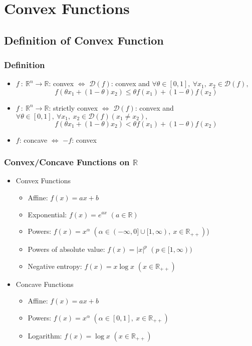 \section{Convex Functions}

\subsection{Definition of Convex Function}

\subsubsection*{Definition}
\begin{itemize}
    \item $f~:~\mathbb{R}^n \rightarrow \mathbb{R}$: convex $\Leftrightarrow$
    $\mathcal{D}(f)$: convex and $\forall \theta \in [0,1],~\forall x_1,~x_2 \in \mathcal{D}(f),$
    $$ f(\theta x_1 + (1 - \theta) x_2 ) \leq \theta f(x_1) + (1 - \theta)f(x_2) $$
    \item $f~:~\mathbb{R}^n \rightarrow \mathbb{R}$: strictly convex $\Leftrightarrow$
    $\mathcal{D}(f)$: convex and $\forall \theta \in [0,1],
    ~\forall x_1,~x_2 \in \mathcal{D}(f) (x_1 \neq x_2),$
    $$ f(\theta x_1 + (1 - \theta) x_2 ) < \theta f(x_1) + (1 - \theta)f(x_2) $$
    \item $f$: concave $\Leftrightarrow$ $-f$: convex
\end{itemize}

\subsubsection*{Convex/Concave Functions on $\mathbb{R}$}
\begin{itemize}
    \item Convex Functions
    \begin{itemize}
        \item Affine: $f(x) = ax + b$
        \item Exponential: $f(x) = e^{ax}$ $(a \in \mathbb{R})$
        \item Powers: $f(x) = x^\alpha$ $\left(\alpha \in (-\infty,0] \cup [1, \infty),~x \in \mathbb{R}_{++}\right)$)
        \item Powers of absolute value: $f(x) = |x|^p$ $(p \in [1,\infty))$
        \item Negative entropy: $f(x) = x \log x$ $(x \in \mathbb{R}_{++})$
    \end{itemize}
    \item Concave Functions
    \begin{itemize}
        \item Affine: $f(x) = ax + b$
        \item Powers: $f(x) = x^\alpha$ $\left(\alpha \in [0,1],~x \in \mathbb{R}_{++}\right)$
        \item Logarithm: $f(x) = \log x$ $(x \in \mathbb{R}_{++})$
    \end{itemize}
\end{itemize}

